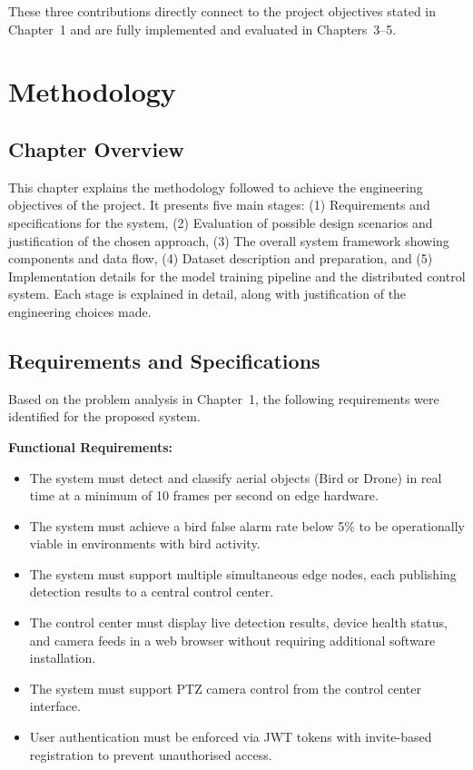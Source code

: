 \documentclass[12pt,a4paper]{report}
\begin{document}
These three contributions directly connect to the project objectives stated
in Chapter~1 and are fully implemented and evaluated in Chapters~3--5.

\chapter{Methodology}

\section{Chapter Overview}

This chapter explains the methodology followed to achieve the engineering
objectives of the project. It presents five main stages: (1) Requirements
and specifications for the system, (2) Evaluation of possible design
scenarios and justification of the chosen approach, (3) The overall system
framework showing components and data flow, (4) Dataset description and
preparation, and (5) Implementation details for the model training pipeline
and the distributed control system. Each stage is explained in detail,
along with justification of the engineering choices made.

\section{Requirements and Specifications}

Based on the problem analysis in Chapter~1, the following requirements were
identified for the proposed system.

\textbf{Functional Requirements:}
\begin{itemize}
  \item The system must detect and classify aerial objects (Bird or Drone)
        in real time at a minimum of 10 frames per second on edge hardware.
  \item The system must achieve a bird false alarm rate below 5\% to be
        operationally viable in environments with bird activity.
  \item The system must support multiple simultaneous edge nodes, each
        publishing detection results to a central control center.
  \item The control center must display live detection results, device
        health status, and camera feeds in a web browser without requiring
        additional software installation.
  \item The system must support PTZ camera control from the control center
        interface.
  \item User authentication must be enforced via JWT tokens with invite-based
        registration to prevent unauthorised access.
\end{itemize}
\end{document}
